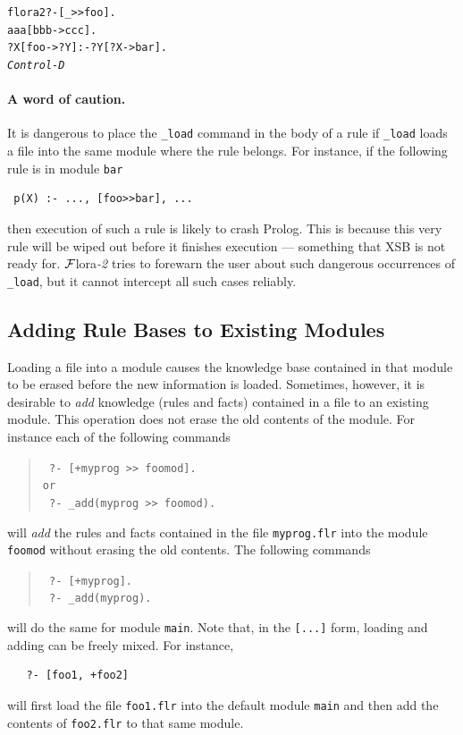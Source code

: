 \documentclass[11pt]{article}
\newcommand{\FLORA}{{\mbox{\sc ${\cal F}${lora}\rm\emph{-2}}}\xspace}
\begin{document}
\begin{alltt}
 flora2 ?- [_>>foo].
 aaa[bbb->ccc].
 ?X[foo->?Y] :- ?Y[?X->bar].
 \emph{Control-D}  
\end{alltt}


\paragraph{A word of caution.} It is dangerous to place the {\tt \_load} command
in the body of a rule if {\tt \_load} loads a file into the same module
where the rule belongs. For instance, if the following rule is in module
{\tt bar}  
\begin{verbatim}
 p(X) :- ..., [foo>>bar], ...  
\end{verbatim}
then execution of such a rule is likely to crash Prolog. This is because
this very rule will be wiped out before it finishes execution --- something
that XSB is not ready for. \FLORA tries to forewarn the user about such
dangerous occurrences of {\tt \_load}, but it cannot intercept all such
cases reliably.


\subsection{Adding Rule Bases to Existing Modules}

Loading a file into a module causes the knowledge base contained in that
module to be erased before the new information is loaded. Sometimes,
however, it is desirable to \emph{add} knowledge (rules and facts)
contained in a file to an existing module.
This operation does not erase the old contents of the module.
For instance each of the following commands 

\index{[+file]}
\begin{quote}
  \tt
   ?- [+myprog >> foomod].\\
   or
   \\
    \tt
   ?- \_add(myprog >> foomod).
\end{quote}
will \emph{add} the rules and facts contained in the file {\tt myprog.flr} into the
module {\tt foomod} without erasing the old contents. The following commands
\begin{quote}
  \tt
   ?- [+myprog].\\
    \tt
   ?- \_add(myprog).
\end{quote}
will do the same for module {\tt main}. Note that, in the {\tt [...]} form,  
loading and adding can be freely mixed. For instance, 
\begin{verbatim}
   ?- [foo1, +foo2]  
\end{verbatim}
will first load the file {\tt foo1.flr} into the default module {\tt main}
and then add the contents of {\tt foo2.flr} to that same module.
\end{document}
